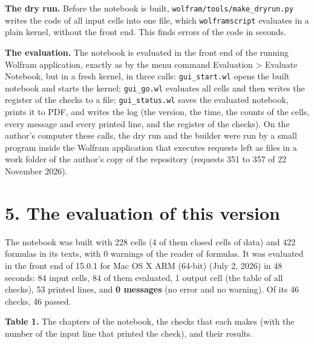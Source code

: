 \documentclass[
  10pt,
]{article}
\begin{document}
\textbf{The dry run.} Before the notebook is built,
\texttt{wolfram/tools/make\_dryrun.py} writes the code of all input
cells into one file, which \texttt{wolframscript} evaluates in a plain
kernel, without the front end. This finds errors of the code in seconds.

\textbf{The evaluation.} The notebook is evaluated in the front end of
the running Wolfram application, exactly as by the menu command
Evaluation \textgreater{} Evaluate Notebook, but in a fresh kernel, in
three calls: \texttt{gui\_start.wl} opens the built notebook and starts
the kernel; \texttt{gui\_go.wl} evaluates all cells and then writes the
register of the checks to a file; \texttt{gui\_status.wl} saves the
evaluated notebook, prints it to PDF, and writes the log (the version,
the time, the counts of the cells, every message and every printed line,
and the register of the checks). On the author's computer these calls,
the dry run and the builder were run by a small program inside the
Wolfram application that executes requests left as files in a work
folder of the author's copy of the repository (requests 351 to 357 of 22
November 2026).

\hypertarget{the-evaluation-of-this-version}{%
\section{5. The evaluation of this
version}\label{the-evaluation-of-this-version}}

The notebook was built with 228 cells (4 of them closed cells of data)
and 422 formulas in its texts, with 0 warnings of the reader of
formulas. It was evaluated in the front end of 15.0.1 for Mac OS X ARM
(64-bit) (July 2, 2026) in 48 seconds: 84 input cells, 84 of them
evaluated, 1 output cell (the table of all checks), 53 printed lines,
and \textbf{0 messages} (no error and no warning). Of its 46 checks, 46
passed.

\textbf{Table 1.} The chapters of the notebook, the checks that each
makes (with the number of the input line that printed the check), and
their results.
\end{document}
